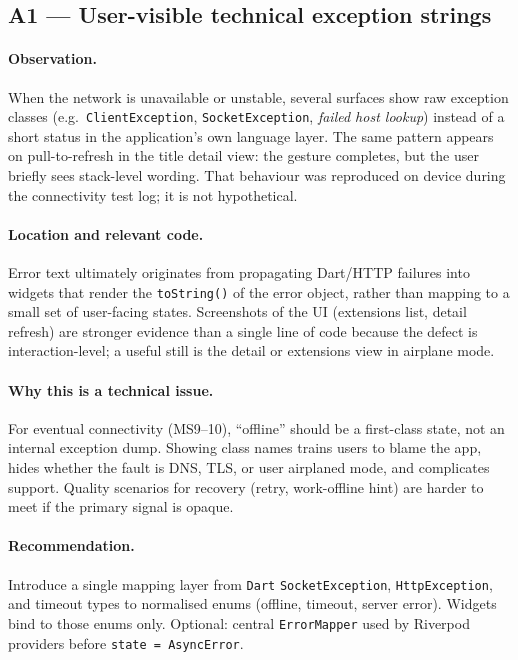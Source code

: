 \subsection*{A1 --- User-visible technical exception strings}
\paragraph{Observation.}
When the network is unavailable or unstable, several surfaces show raw exception classes (e.g.\ \texttt{ClientException}, \texttt{SocketException}, \emph{failed host lookup}) instead of a short status in the application's own language layer. The same pattern appears on pull-to-refresh in the title detail view: the gesture completes, but the user briefly sees stack-level wording. That behaviour was reproduced on device during the connectivity test log; it is not hypothetical.

\paragraph{Location and relevant code.}
Error text ultimately originates from propagating Dart/HTTP failures into widgets that render the \texttt{toString()} of the error object, rather than mapping to a small set of user-facing states. Screenshots of the UI (extensions list, detail refresh) are stronger evidence than a single line of code because the defect is interaction-level; a useful still is the detail or extensions view in airplane mode.

\paragraph{Why this is a technical issue.}
For eventual connectivity (MS9--10), ``offline'' should be a first-class state, not an internal exception dump. Showing class names trains users to blame the app, hides whether the fault is DNS, TLS, or user airplaned mode, and complicates support. Quality scenarios for recovery (retry, work-offline hint) are harder to meet if the primary signal is opaque.

\paragraph{Recommendation.}
Introduce a single mapping layer from \texttt{Dart} \texttt{SocketException}, \texttt{HttpException}, and timeout types to normalised enums (offline, timeout, server error). Widgets bind to those enums only. Optional: central \texttt{ErrorMapper} used by Riverpod providers before \texttt{state = AsyncError}.


